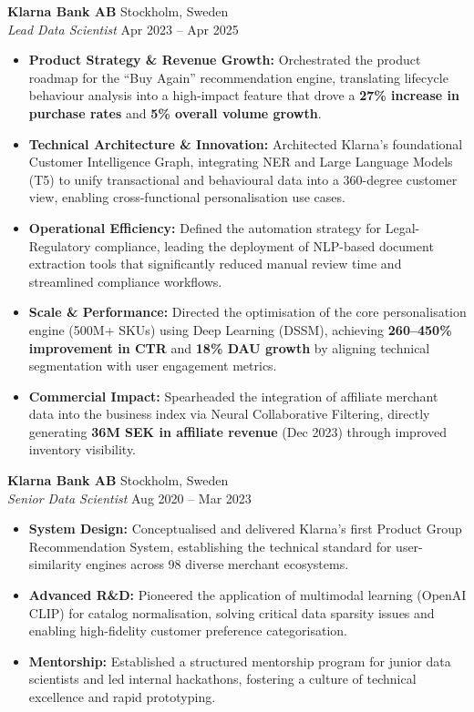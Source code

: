 \documentclass[11pt,a4paper]{article}
\begin{document}
\noindent \textbf{Klarna Bank AB} \hfill Stockholm, Sweden \\
\textit{Lead Data Scientist} \hfill Apr 2023 -- Apr 2025
\begin{itemize}[leftmargin=*, label=\textbullet]
    \item \textbf{Product Strategy \& Revenue Growth:} Orchestrated the product roadmap for the ``Buy Again'' recommendation engine, translating lifecycle behaviour analysis into a high-impact feature that drove a \textbf{27\% increase in purchase rates} and \textbf{5\% overall volume growth}.
    \item \textbf{Technical Architecture \& Innovation:} Architected Klarna's foundational Customer Intelligence Graph, integrating NER and Large Language Models (T5) to unify transactional and behavioural data into a 360-degree customer view, enabling cross-functional personalisation use cases.
    \item \textbf{Operational Efficiency:} Defined the automation strategy for Legal-Regulatory compliance, leading the deployment of NLP-based document extraction tools that significantly reduced manual review time and streamlined compliance workflows.
    \item \textbf{Scale \& Performance:} Directed the optimisation of the core personalisation engine (500M+ SKUs) using Deep Learning (DSSM), achieving \textbf{260--450\% improvement in CTR} and \textbf{18\% DAU growth} by aligning technical segmentation with user engagement metrics.
    \item \textbf{Commercial Impact:} Spearheaded the integration of affiliate merchant data into the business index via Neural Collaborative Filtering, directly generating \textbf{36M SEK in affiliate revenue} (Dec 2023) through improved inventory visibility.
\end{itemize}

\newpage

\noindent \textbf{Klarna Bank AB} \hfill Stockholm, Sweden \\
\textit{Senior Data Scientist} \hfill Aug 2020 -- Mar 2023
\begin{itemize}[leftmargin=*, label=\textbullet]
    \item \textbf{System Design:} Conceptualised and delivered Klarna’s first Product Group Recommendation System, establishing the technical standard for user-similarity engines across 98 diverse merchant ecosystems.
    \item \textbf{Advanced R\&D:} Pioneered the application of multimodal learning (OpenAI CLIP) for catalog normalisation, solving critical data sparsity issues and enabling high-fidelity customer preference categorisation.
    \item \textbf{Mentorship:} Established a structured mentorship program for junior data scientists and led internal hackathons, fostering a culture of technical excellence and rapid prototyping.
\end{itemize}
\end{document}
